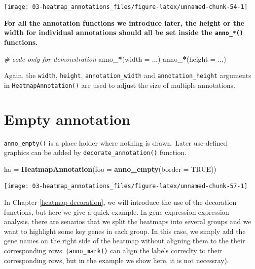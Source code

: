 \documentclass[]{book}
\newenvironment{Shaded}{\begin{snugshade}}{\end{snugshade}}
\newcommand{\KeywordTok}[1]{\textcolor[rgb]{0.13,0.29,0.53}{\textbf{#1}}}
\newcommand{\DataTypeTok}[1]{\textcolor[rgb]{0.13,0.29,0.53}{#1}}
\newcommand{\StringTok}[1]{\textcolor[rgb]{0.31,0.60,0.02}{#1}}
\newcommand{\CommentTok}[1]{\textcolor[rgb]{0.56,0.35,0.01}{\textit{#1}}}
\newcommand{\OtherTok}[1]{\textcolor[rgb]{0.56,0.35,0.01}{#1}}
\newcommand{\OperatorTok}[1]{\textcolor[rgb]{0.81,0.36,0.00}{\textbf{#1}}}
\newcommand{\NormalTok}[1]{#1}
\theoremstyle{definition}
\theoremstyle{definition}
\theoremstyle{definition}
\theoremstyle{remark}
\begin{document}
\begin{center}\texttt{[image: 03-heatmap\_annotations\_files/figure-latex/unnamed-chunk-54-1]} \end{center}

\textbf{For all the annotation functions we introduce later, the height
or the width for individual annotations should all be set inside the
\texttt{anno\_*()} functions.}

\begin{Shaded}
\begin{Highlighting}[]
\CommentTok{# code only for demonstration}
\NormalTok{anno_}\OperatorTok{*}\NormalTok{(}\DataTypeTok{width =}\NormalTok{ ...)}
\NormalTok{anno_}\OperatorTok{*}\NormalTok{(}\DataTypeTok{height =}\NormalTok{ ...)}
\end{Highlighting}
\end{Shaded}

Again, the \texttt{width}, \texttt{height}, \texttt{annotation\_width}
and \texttt{annotation\_height} arguments in
\texttt{HeatmapAnnotation()} are used to adjust the size of multiple
annotations.

\section{Empty annotation}\label{empty-annotation}

\texttt{anno\_empty()} is a place holder where nothing is drawn. Later
use-defined graphics can be added by \texttt{decorate\_annotation()}
function.

\begin{Shaded}
\begin{Highlighting}[]
\NormalTok{ha =}\StringTok{ }\KeywordTok{HeatmapAnnotation}\NormalTok{(}\DataTypeTok{foo =} \KeywordTok{anno_empty}\NormalTok{(}\DataTypeTok{border =} \OtherTok{TRUE}\NormalTok{))}
\end{Highlighting}
\end{Shaded}

\begin{center}\texttt{[image: 03-heatmap\_annotations\_files/figure-latex/unnamed-chunk-57-1]} \end{center}

In Chapter \ref{heatmap-decoration}, we will introduce the use of the
decoration functions, but here we give a quick example. In gene
expression expression analysis, there are senarios that we split the
heatmaps into several groups and we want to highlight some key genes in
each group. In this case, we simply add the gene names on the right side
of the heatmap without aligning them to the their corresponding rows.
(\texttt{anno\_mark()} can align the labels correclty to their
corresponding rows, but in the example we show here, it is not
necessray).
\end{document}
